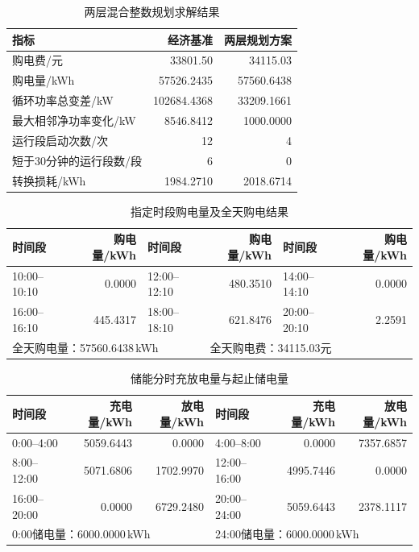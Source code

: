 \begin{table}[H]\centering\small
\caption{两层混合整数规划求解结果}\label{tab:q1-compare}
\begin{tabular}{lrr}\toprule 指标&经济基准&两层规划方案\\\midrule
购电费/元&33801.50&34115.03\\
购电量/kWh&57526.2435&57560.6438\\
循环功率总变差/kW&102684.4368&33209.1661\\
最大相邻净功率变化/kW&8546.8412&1000.0000\\
运行段启动次数/次&12&4\\
短于30分钟的运行段数/段&6&0\\
转换损耗/kWh&1984.2710&2018.6714\\
\bottomrule\end{tabular}\end{table}
\begin{table}[H]\centering\small
\caption{指定时段购电量及全天购电结果}\label{tab:q1-purchase}
\begin{tabular}{lrlrlr}\toprule 时间段&购电量/kWh&时间段&购电量/kWh&时间段&购电量/kWh\\\midrule
10:00--10:10&0.0000&12:00--12:10&480.3510&14:00--14:10&0.0000\\
16:00--16:10&445.4317&18:00--18:10&621.8476&20:00--20:10&2.2591\\
\midrule
\multicolumn{3}{l}{全天购电量：57560.6438\,kWh}&\multicolumn{3}{l}{全天购电费：34115.03元}\\
\bottomrule\end{tabular}\end{table}
\begin{table}[H]\centering\small
\caption{储能分时充放电量与起止储电量}\label{tab:q1-storage}
\begin{tabular}{lrrlrr}\toprule 时间段&充电量/kWh&放电量/kWh&时间段&充电量/kWh&放电量/kWh\\\midrule
0:00--4:00&5059.6443&0.0000&4:00--8:00&0.0000&7357.6857\\
8:00--12:00&5071.6806&1702.9970&12:00--16:00&4995.7446&0.0000\\
16:00--20:00&0.0000&6729.2480&20:00--24:00&5059.6443&2378.1117\\
\midrule\multicolumn{3}{l}{0:00储电量：6000.0000\,kWh}&\multicolumn{3}{l}{24:00储电量：6000.0000\,kWh}\\
\bottomrule\end{tabular}\end{table}

